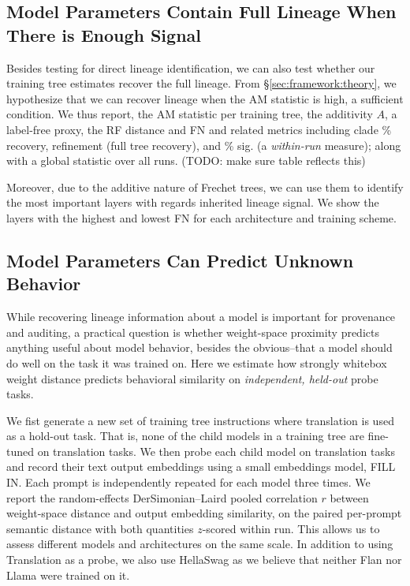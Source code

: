 \documentclass{article}
\theoremstyle{definition}
\theoremstyle{plain}
\begin{document}
\subsection{Model Parameters Contain Full Lineage When There is Enough Signal}
\label{sec:exp:weights}

Besides testing for direct lineage identification, we can also test whether our training tree estimates recover the full lineage.  From \S \ref{sec:framework:theory}, we hypothesize that we can recover lineage when the AM statistic is high, a sufficient condition.  We thus report, the AM statistic per training tree, the additivity $A$, a label-free proxy, the RF distance and FN and related metrics including clade \% recovery, refinement (full tree recovery), and \% sig. (a \textit{within-run} measure); along with a global statistic over all runs. (TODO: make sure table reflects this)

Moreover, due to the additive nature of Frechet trees, we can use them to identify the most important layers with regards inherited lineage signal.  We show the layers with the highest and lowest FN for each architecture and training scheme.


\subsection{Model Parameters Can Predict Unknown Behavior}
\label{sec:exp:behavioral}

While recovering lineage information about a model is important for
provenance and auditing, a practical question is whether weight-space
proximity predicts anything useful about model behavior, besides the obvious--that a model should do well on the task it was trained on. Here we estimate
how strongly whitebox weight distance predicts behavioral similarity on \textit{independent, held-out} probe tasks.

We fist generate a new set of training tree instructions where translation is used as a hold-out task.  That is, none of the child models in a training tree are fine-tuned on translation tasks.  We then probe each child model on translation tasks and record their text output embeddings using a small embeddings model, FILL IN.  Each prompt is independently repeated for each model three times.  We report the random-effects DerSimonian–Laird \citeyear{dersimonianlaird1986} pooled correlation $r$ between weight-space distance and output embedding similarity, on the paired per-prompt semantic distance with both quantities $z$-scored within run.  This allows us to assess different models and architectures on the same scale.  In addition to using Translation as a probe, we also use HellaSwag as we believe that neither Flan nor Llama were trained on it.
\end{document}
